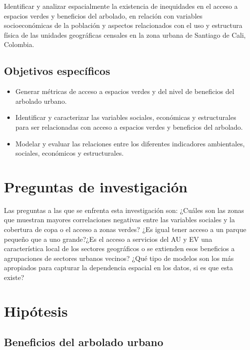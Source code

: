 \documentclass[12pt,a4paper,openany]{book}
\providecommand{\tightlist}{%
  \setlength{\itemsep}{0pt}\setlength{\parskip}{0pt}}
\theoremstyle{definition}
\theoremstyle{definition}
\theoremstyle{definition}
\theoremstyle{remark}
\begin{document}
Identificar y analizar espacialmente la existencia de inequidades en el
acceso a espacios verdes y beneficios del arbolado, en relación con
variables socioeconómicas de la población y aspectos relacionados con el
uso y estructura física de las unidades geográficas censales en la zona
urbana de Santiago de Cali, Colombia.

\subsection{Objetivos específicos}\label{objetivos-especuxedficos}

\begin{itemize}
\tightlist
\item
  Generar métricas de acceso a espacios verdes y del nivel de beneficios
  del arbolado urbano.
\item
  Identificar y caracterizar las variables sociales, económicas y
  estructurales para ser relacionadas con acceso a espacios verdes y
  beneficios del arbolado.
\item
  Modelar y evaluar las relaciones entre los diferentes indicadores
  ambientales, sociales, económicos y estructurales.
\end{itemize}

\section{Preguntas de
investigación}\label{preguntas-de-investigaciuxf3n}

Las preguntas a las que se enfrenta esta investigación son: ¿Cuáles son
las zonas que muestran mayores correlaciones negativas entre las
variables sociales y la cobertura de copa o el acceso a zonas verdes?
¿Es igual tener acceso a un parque pequeño que a uno grande?¿Es el
acceso a servicios del AU y EV una característica local de los sectores
geográficos o se extienden esos beneficios a agrupaciones de sectores
urbanos vecinos? ¿Qué tipo de modelos son los más apropiados para
capturar la dependencia espacial en los datos, si es que esta existe?

\section{Hipótesis}\label{hipuxf3tesis}

\subsection{Beneficios del arbolado
urbano}\label{beneficios-del-arbolado-urbano}
\end{document}

